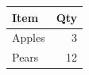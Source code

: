 \begin{tabular}{lr}
\toprule
Item & Qty \\
\midrule
Apples & 3 \\
Pears & 12 \\
\bottomrule
\end{tabular}
